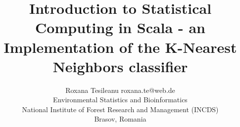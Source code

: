 \documentclass[twoside, 11p]{article}
\begin{document}
\title{Introduction to Statistical Computing in Scala - an Implementation of the K-Nearest Neighbors classifier}

\author{\name Roxana Tesileanu \email roxana.te@web.de \\
	\addr Environmental Statistics and Bioinformatics \\
	National Institute of Forest Research and Management (INCDS)\\
	Brasov, Romania} 
\end{document}
